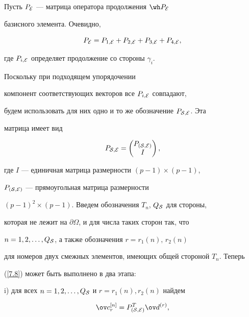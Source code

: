 Пусть $P_{\cal E} $ --- матрица оператора продолжения $\wh P_{\cal E}$ 


базисного элемента. Очевидно,


\begin{equation}


P_{\cal E}=P_{1,\cal E}+P_{2,\cal E}+P_{3,\cal E}+P_{4,\cal E},


\end{equation}


где $P_{i,\cal E}$ определяет продолжение со стороны ${\gamma}_i$.


Поскольку при подходящем упорядочении 


компонент соответствующих векторов все $P_{i,\cal E}$ совпадают, 


будем использовать для них одно и то же обозначение $P_{\cal S,E}$. Эта 


матрица имеет вид 


\begin{equation}


P_{\cal S,E}=


\begin{pmatrix}


P_{({\cal S,E})}\\


I


\end{pmatrix}


,


\end{equation}


где $I$ --- единичная матрица размерности $(p-1)\times (p-1)$, 


$P_{({\cal S,E})}$ --- прямоугольная матрица размерности 


$(p-1)^2\times (p-1)$. Введем обозначения $T_n$, $Q_{\cal S}$ для стороны, 


которая не лежит на $\partial{\Omega}$, и для числа таких сторон так, что 


$n=1,2,\dotsc,Q_{\cal S}$, а также обозначения $r=r_1(n),\,r_2(n)$


для номеров двух смежных элементов, имеющих общей стороной $T_n$. Теперь 


(\ref{7.8}) может быть выполнено в два этапа:





i) для всех $n=1,2,\dotsc,Q_{\cal S}$ и $r=r_1(n),r_2(n)$ найдем


\begin{equation}


\ov c^{[n]}_r=P_{({\cal S,E})}^T\ov d^{(r)},


\end{equation}





